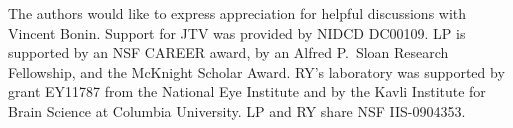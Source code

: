The authors would like to express appreciation for helpful discussions with Vincent Bonin.  Support for JTV was provided by NIDCD DC00109. LP is supported by an NSF CAREER award, by an Alfred P.\ Sloan Research Fellowship, and the McKnight Scholar Award. RY's laboratory was supported by grant EY11787 from the National Eye Institute and by the Kavli Institute for Brain Science at Columbia University.  LP and RY share NSF IIS-0904353.

\appendix

\clearpage

%
%

%

% 

